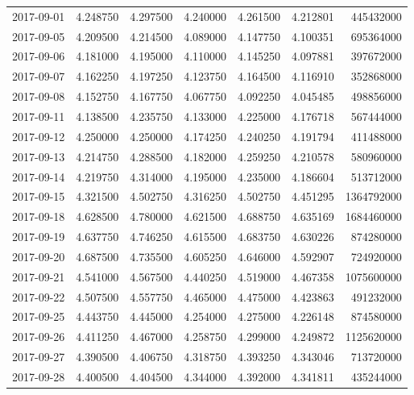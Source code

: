 \begin{tabular}{lrrrrrr}
2017-09-01 &    4.248750 &    4.297500 &    4.240000 &    4.261500 &    4.212801 &   445432000 \\
2017-09-05 &    4.209500 &    4.214500 &    4.089000 &    4.147750 &    4.100351 &   695364000 \\
2017-09-06 &    4.181000 &    4.195000 &    4.110000 &    4.145250 &    4.097881 &   397672000 \\
2017-09-07 &    4.162250 &    4.197250 &    4.123750 &    4.164500 &    4.116910 &   352868000 \\
2017-09-08 &    4.152750 &    4.167750 &    4.067750 &    4.092250 &    4.045485 &   498856000 \\
2017-09-11 &    4.138500 &    4.235750 &    4.133000 &    4.225000 &    4.176718 &   567444000 \\
2017-09-12 &    4.250000 &    4.250000 &    4.174250 &    4.240250 &    4.191794 &   411488000 \\
2017-09-13 &    4.214750 &    4.288500 &    4.182000 &    4.259250 &    4.210578 &   580960000 \\
2017-09-14 &    4.219750 &    4.314000 &    4.195000 &    4.235000 &    4.186604 &   513712000 \\
2017-09-15 &    4.321500 &    4.502750 &    4.316250 &    4.502750 &    4.451295 &  1364792000 \\
2017-09-18 &    4.628500 &    4.780000 &    4.621500 &    4.688750 &    4.635169 &  1684460000 \\
2017-09-19 &    4.637750 &    4.746250 &    4.615500 &    4.683750 &    4.630226 &   874280000 \\
2017-09-20 &    4.687500 &    4.735500 &    4.605250 &    4.646000 &    4.592907 &   724920000 \\
2017-09-21 &    4.541000 &    4.567500 &    4.440250 &    4.519000 &    4.467358 &  1075600000 \\
2017-09-22 &    4.507500 &    4.557750 &    4.465000 &    4.475000 &    4.423863 &   491232000 \\
2017-09-25 &    4.443750 &    4.445000 &    4.254000 &    4.275000 &    4.226148 &   874580000 \\
2017-09-26 &    4.411250 &    4.467000 &    4.258750 &    4.299000 &    4.249872 &  1125620000 \\
2017-09-27 &    4.390500 &    4.406750 &    4.318750 &    4.393250 &    4.343046 &   713720000 \\
2017-09-28 &    4.400500 &    4.404500 &    4.344000 &    4.392000 &    4.341811 &   435244000 \\

\end{tabular}

